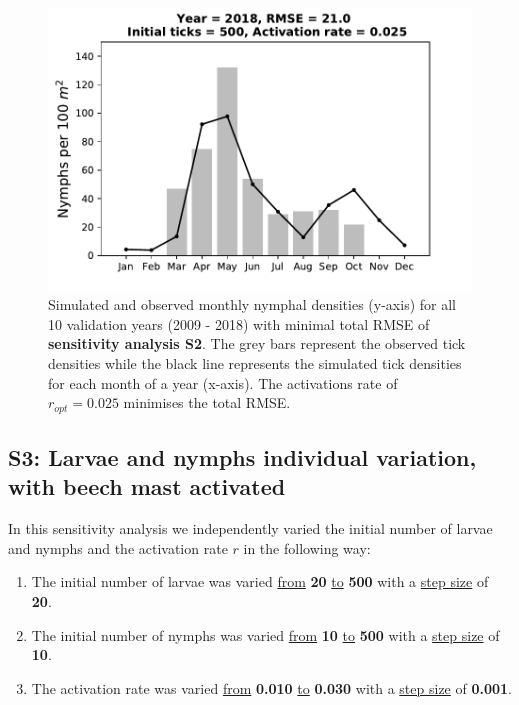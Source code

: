 \documentclass[a4paper, 11pt]{scrartcl}
\begin{document}
\begin{figure}[h!]
\begin{minipage}[c]{0.40\linewidth}
\end{minipage}
\begin{minipage}[c]{0.40\linewidth}
\includegraphics[width=\linewidth]{figures/s2/S2_2018}
\end{minipage}
\caption{Simulated and observed monthly nymphal densities (y-axis) for all 10 validation years (2009 - 2018) with minimal total RMSE of \textbf{sensitivity analysis S2}. The grey bars represent the observed tick densities while the black line represents the simulated tick densities for each month of a year (x-axis). The activations rate of $r_{opt}= 0.025$ minimises the total RMSE.}
\label{fig:initial_ticks_without_beech}
\end{figure}


\newpage
\subsection{S3: Larvae and nymphs individual variation, with beech mast activated}
In this sensitivity analysis we independently varied the initial number of larvae and nymphs and the activation rate $r$ in the following way:

\begin{enumerate}
\item The initial number of larvae was varied \underline{from} \textbf{20} \underline{to} \textbf{500} with a \underline{step size} of \textbf{20}.
\item The initial number of nymphs was varied \underline{from} \textbf{10} \underline{to} \textbf{500} with a \underline{step size} of \textbf{10}.
\item The activation rate was varied \underline{from} \textbf{0.010} \underline{to} \textbf{0.030} with a \underline{step size} of \textbf{0.001}.
\end{enumerate}
\end{document}
